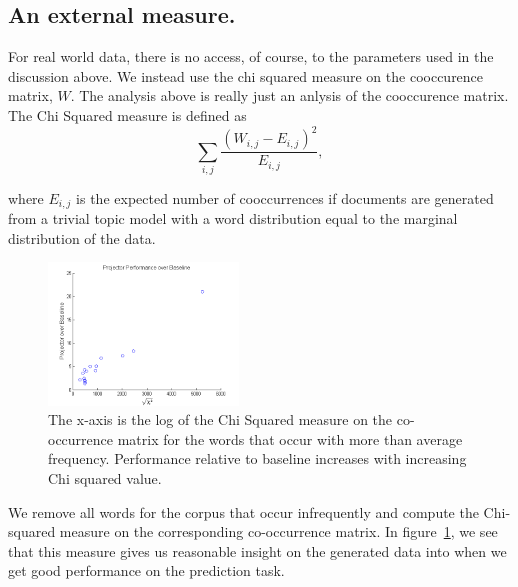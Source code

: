 \subsection{An external measure.}


For real world data, there is no access, of course, to the parameters
used in the discussion above. We instead use the chi squared measure
on the cooccurence matrix, $W$.  The analysis above is really just an
anlysis of the cooccurence matrix. The Chi Squared measure is defined
as $$\sum_{i,j} \frac{(W_{i,j} - E_{i,j})^2}{E_{i,j}},$$

where $E_{i,j}$ is the expected number of cooccurrences if
documents are generated from a trivial topic model with
a word distribution equal to the marginal distribution
of the data. 


\begin{figure}
     \begin{center}
            \includegraphics[width=0.45\textwidth]{x2.png}

    \end{center}
    \caption{The x-axis is the log of the Chi Squared measure on the co-occurrence matrix for the words that occur with more than average frequency. Performance relative to baseline increases with increasing Chi squared value.}
   \label{fig:x2}
\end{figure}


We remove all words for the corpus that occur infrequently and
compute the Chi-squared measure on the corresponding co-occurrence
matrix.  In figure~\ref{fig:x2}, we see that this measure 
gives us reasonable insight on the generated data
into when we get good performance on the prediction
task. 


